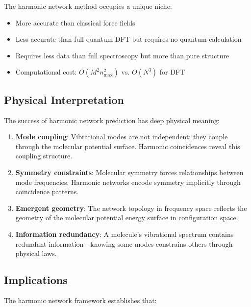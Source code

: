The harmonic network method occupies a unique niche:
\begin{itemize}
\item More accurate than classical force fields
\item Less accurate than full quantum DFT but requires no quantum calculation
\item Requires less data than full spectroscopy but more than pure structure
\item Computational cost: $O(M^2 n_{\max}^2)$ vs. $O(N^3)$ for DFT
\end{itemize}

\subsection{Physical Interpretation}

The success of harmonic network prediction has deep physical meaning:

\begin{enumerate}
\item \textbf{Mode coupling}: Vibrational modes are not independent; they couple through the molecular potential surface. Harmonic coincidences reveal this coupling structure.

\item \textbf{Symmetry constraints}: Molecular symmetry forces relationships between mode frequencies. Harmonic networks encode symmetry implicitly through coincidence patterns.

\item \textbf{Emergent geometry}: The network topology in frequency space reflects the geometry of the molecular potential energy surface in configuration space.

\item \textbf{Information redundancy}: A molecule's vibrational spectrum contains redundant information - knowing some modes constrains others through physical laws.
\end{enumerate}

\subsection{Implications}

The harmonic network framework establishes that:

